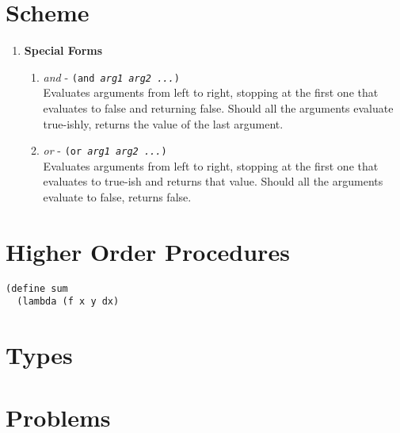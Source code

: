 


\section*{Scheme}

\begin{enumerate}
\item {\bf Special Forms}
  \begin{enumerate}
  \item {\large {\it and}} - {\tt (and {\it arg1 arg2 ...})}\\
    Evaluates arguments from left to right, stopping at the first one
    that evaluates to false and returning false.  Should all the
    arguments evaluate true-ishly, returns the value of the last
    argument.
    \vspace{1in}
  \item {\large {\it or}} - {\tt (or {\it arg1 arg2 ...})}\\ Evaluates
    arguments from left to right, stopping at the first one that
    evaluates to true-ish and returns that value.  Should all the
    arguments evaluate to false, returns false.
    \vspace{1in}
  \end{enumerate}
\end{enumerate}

\section*{Higher Order Procedures}

\begin{verbatim}
(define sum
  (lambda (f x y dx)
\end{verbatim}

\newpage

\section*{Types}

\section*{Problems}

